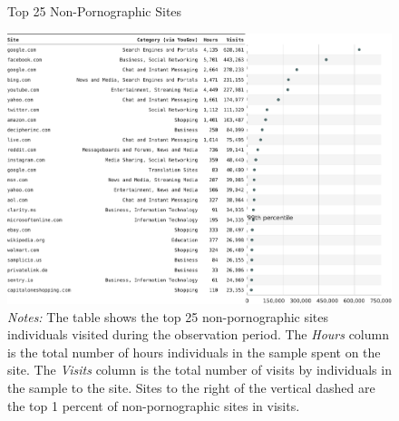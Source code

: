\documentclass[12pt,twoside]{article}
\begin{document}
\begin{figure}[h]
	\centering
	\caption{Top 25 Non-Pornographic Sites}
	\includegraphics[width=\textwidth]{figs/top_25_nonadultsites.pdf}
	\caption*{\footnotesize \emph{Notes:} 
		The table shows the top 25 non-pornographic sites individuals visited during the observation period.
		The \emph{Hours} column is the total number of hours individuals in the sample spent on the site. 
		The \emph{Visits} column is the total number of visits by individuals in the sample to the site.  			
		Sites to the right of the vertical dashed are the top 1 percent of non-pornographic sites in visits.
	}
	\label{fig:top25_nonadult}
\end{figure}
\end{document}
